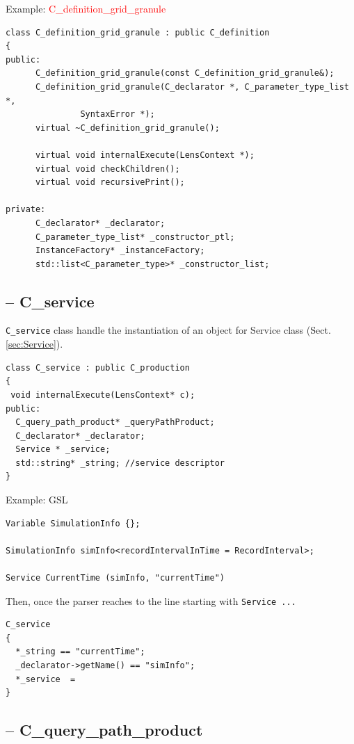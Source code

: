 Example: \textcolor{red}{C\_definition\_grid\_granule}
\begin{verbatim}
class C_definition_grid_granule : public C_definition
{
public:
      C_definition_grid_granule(const C_definition_grid_granule&);
      C_definition_grid_granule(C_declarator *, C_parameter_type_list *, 
			   SyntaxError *);
      virtual ~C_definition_grid_granule();

      virtual void internalExecute(LensContext *);
      virtual void checkChildren();
      virtual void recursivePrint();
      
private:
      C_declarator* _declarator;
      C_parameter_type_list* _constructor_ptl;
      InstanceFactory* _instanceFactory;
      std::list<C_parameter_type>* _constructor_list;
\end{verbatim}

\subsection{-- C\_service}
\label{sec:C_service}


\verb!C_service! class handle the instantiation of an object for Service class
(Sect.\ref{sec:Service}).

\begin{verbatim}
class C_service : public C_production
{
 void internalExecute(LensContext* c);
public:
  C_query_path_product* _queryPathProduct;
  C_declarator* _declarator;
  Service * _service;
  std::string* _string; //service descriptor
} 
\end{verbatim}

Example: GSL
\begin{verbatim}
Variable SimulationInfo {};

SimulationInfo simInfo<recordIntervalInTime = RecordInterval>;

Service CurrentTime (simInfo, "currentTime")
\end{verbatim}

Then, once the parser reaches to the line starting with \verb!Service ...!
\begin{verbatim}
C_service 
{
  *_string == "currentTime";
  _declarator->getName() == "simInfo";
  *_service  =   
}
\end{verbatim}




\subsection{-- C\_query\_path\_product}
\label{sec:C_query_path_product}

